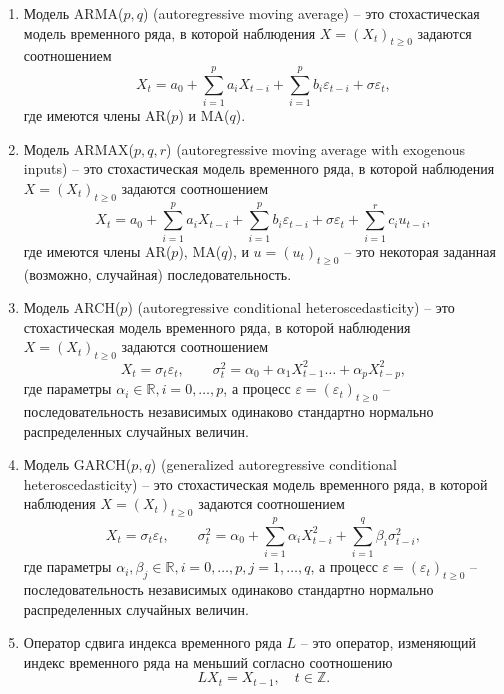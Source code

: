 \documentclass[a4paper,14pt]{extreport}
\renewcommand{\=}[1]{\stackrel{#1}{=}} %
\newcommand{\generaltime}{t \geqslant 0}
\newcommand{\newprocess}[1]{
	\ensuremath{
		#1 = \left(#1 _t\right)_{\generaltime}
	}
}
\newenvironment{boenumerate}
  {\begin{enumerate}\renewcommand\labelenumi{\textbf{\theenumi.}}}
  {\end{enumerate}}
\begin{document}
\begin{boenumerate}
\item Модель ARMA($p, q$) (autoregressive moving average) -- 
это стохастическая модель временного ряда, в которой наблюдения $\newprocess{X}$
задаются соотношением
\[
X_t = a_0 + \sum\limits_{i=1}^p a_i X_{t-i} 
	+ \sum\limits_{i=1}^p b_i \varepsilon_{t-i} + \sigma \varepsilon_t,
\]
где имеются члены AR($p$) и MA($q$).

\item Модель ARMAX($p, q, r$) (autoregressive moving average with exogenous inputs) -- 
это стохастическая модель временного ряда, в которой наблюдения $\newprocess{X}$
задаются соотношением
\[
X_t = a_0 + \sum\limits_{i=1}^p a_i X_{t-i} 
	+ \sum\limits_{i=1}^p b_i \varepsilon_{t-i} + \sigma \varepsilon_t
	+ \sum\limits_{i=1}^r c_i u_{t-i},
\]
где имеются члены AR($p$), MA($q$), и
$\newprocess{u}$ -- это некоторая заданная (возможно, случайная)
последовательность.

\item Модель ARCH($p$) (autoregressive conditional heteroscedasticity) -- 
это стохастическая модель временного ряда, в которой наблюдения $\newprocess{X}$
задаются соотношением
\[
X_t = \sigma_t \varepsilon_t,
\qquad
\sigma^2_t = \alpha_0 + \alpha_1 X^2_{t-1} \ldots + \alpha_p X^2_{t-p},
\]
где параметры $\alpha_i \in \mathbb{R}, i=0, \ldots, p$,
а процесс $\newprocess{\varepsilon}$ -- последовательность 
независимых одинаково стандартно нормально распределенных случайных величин.

\item Модель GARCH($p, q$) (generalized autoregressive conditional heteroscedasticity) -- 
это стохастическая модель временного ряда, в которой наблюдения $\newprocess{X}$
задаются соотношением
\[
X_t = \sigma_t \varepsilon_t,
\qquad
\sigma^2_t = \alpha_0 + \sum\limits_{i = 1}^p\alpha_i X^2_{t-i} + \sum\limits_{i = 1}^q \beta_i \sigma^2_{t-i},
\]
где параметры $\alpha_i, \beta_j \in \mathbb{R},
 i=0, \ldots, p, j = 1, \ldots, q$,
а процесс $\newprocess{\varepsilon}$ -- последовательность 
независимых одинаково стандартно нормально распределенных случайных величин.

\item Оператор сдвига индекса временного ряда $L$ -- это оператор, изменяющий
индекс временного ряда на меньший согласно соотношению
\[
LX_{t} = X_{t - 1}, \quad t \in \mathbb{Z}.
\]

\end{boenumerate}
\end{document}
